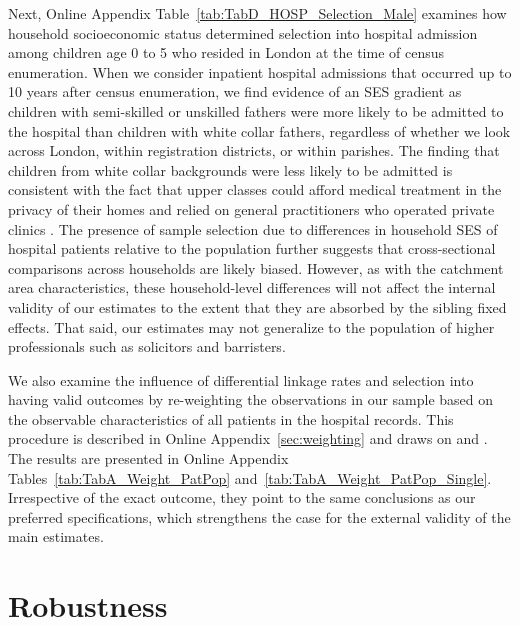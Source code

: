 \documentclass[12pt,english]{article}
\begin{document}
Next, Online Appendix Table~\ref{tab:TabD_HOSP_Selection_Male} examines how household socioeconomic status determined selection into hospital admission among children age 0 to 5 who resided in London at the time of census enumeration. When we consider inpatient hospital admissions that occurred up to 10 years after census enumeration, we find evidence of an SES gradient as children with semi-skilled or unskilled fathers were more likely to be admitted to the hospital than children with white collar fathers, regardless of whether we look across London, within registration districts, or within parishes. The finding that children from white collar backgrounds were less likely to be admitted is consistent with the fact that upper classes could afford medical treatment in the privacy of their homes and relied on general practitioners who operated private clinics \citep{Carpenter2010}. The presence of sample selection due to differences in household SES of hospital patients relative to the population further suggests that cross-sectional comparisons across households are likely biased. However, as with the catchment area characteristics, these household-level differences will not affect the internal validity of our estimates to the extent that they are absorbed by the sibling fixed effects. That said, our estimates may not generalize to the population of higher professionals such as solicitors and barristers. 

We also examine the influence of differential linkage rates and selection into having valid outcomes by re-weighting the observations in our sample based on the observable characteristics of all patients in the hospital records. This procedure is described in Online Appendix~\ref{sec:weighting} and draws on \cite{BaileyColeMassey2020} and \cite{Black2020}. The results are presented in Online Appendix Tables~\ref{tab:TabA_Weight_PatPop} and~\ref{tab:TabA_Weight_PatPop_Single}. Irrespective of the exact outcome, they point to the same conclusions as our preferred specifications, which strengthens the case for the external validity of the main estimates.

\section[Robustness]{Robustness}\label{sec:Robustness}
\end{document}

